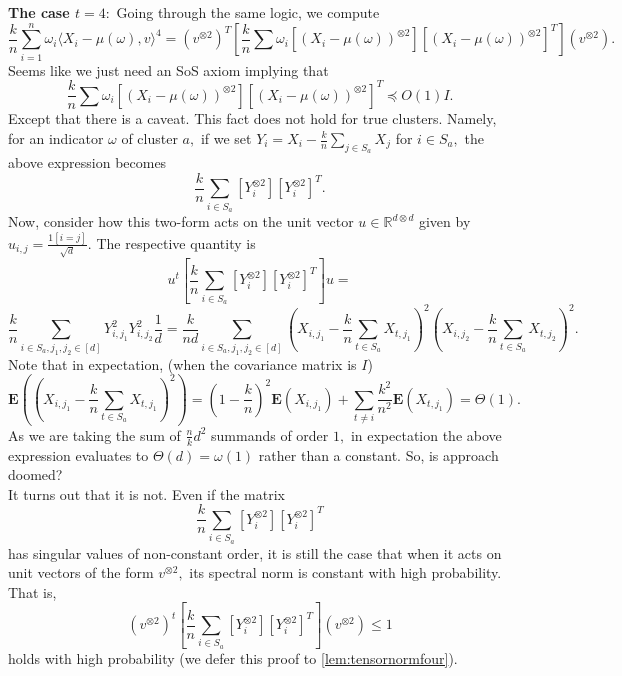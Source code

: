 \documentclass[12pt]{article}%
\newcommand{\expect}{\mathbf{E}}
\begin{document}
\noindent
\textbf{The case $t = 4:$ }Going through the same logic, we compute
$$
\frac{k}{n}
\sum^n_{i=1} \omega_i 
\langle X_i - \mu(\omega), 
v\rangle ^4  = 
(v^{\otimes 2})^T
\left[
\frac{k}{n}
\sum \omega_i
\left[(X_i - \mu(\omega))^{\otimes 2}\right]
\left[(X_i - \mu(\omega))^{\otimes 2}\right]^T
\right]
(v^{\otimes 2}).
$$
Seems like we just need an SoS axiom implying that 
$$
\frac{k}{n}
\sum \omega_i
\left[(X_i - \mu(\omega))^{\otimes 2}\right]
\left[(X_i - \mu(\omega))^{\otimes 2}\right]^T \preceq 
O(1)I.
$$
Except that there is a caveat. This fact does not hold for true clusters. Namely, for an indicator $\omega$ of cluster $a,$ if we set $Y_i = X_i - \frac{k}{n}\sum_{j \in S_a}X_j$ for $i \in S_a,$ the above expression becomes
$$
\frac{k}{n}
\sum_{i \in S_a}
\left[Y_i^{\otimes 2}\right]
\left[Y_i^{\otimes 2}\right]^T.
$$
Now, consider how this two-form acts on the unit vector $u \in \mathbb{R}^{d\otimes d}$ given by $u_{i,j} = 
\frac{1[i = j]}{\sqrt{d}}.
$ The respective quantity is
$$
u^t\left[
\frac{k}{n}
\sum_{i \in S_a}
\left[Y_i^{\otimes 2}\right]
\left[Y_i^{\otimes 2}\right]^T
\right]u = 
$$
$$
\frac{k}{n}\sum_{i \in S_a, j_1, j_2 \in [d]} Y_{i,j_1}^2Y_{i,j_2}^2\frac{1}{d} = 
\frac{k}{nd}\sum_{i \in S_a, j_1,j_2 \in [d]}
(X_{i,j_1} - \frac{k}{n}\sum_{t \in S_a}X_{t,j_1})^2
(X_{i,j_2} - \frac{k}{n}\sum_{t \in S_a}X_{t,j_2})^2
.
$$
Note that in expectation, (when the covariance matrix is $I$)
$$\expect((X_{i,j_1} - \frac{k}{n}\sum_{t \in S_a}X_{t,j_1})^2) = 
(1 - \frac{k}{n})^2 \expect (X_{i,j_1}) + 
\sum_{t\neq i}\frac{k^2}{n^2}\expect(X_{t,j_1})
 = \Theta(1).
$$
As we are taking the sum of $\frac{n}{k}d^2$ summands of order $1,$ in expectation the above expression evaluates to 
$\Theta(d) = \omega(1)$ rather than a constant. So, is approach doomed?\\

\noindent
It turns out that it is not. Even if the matrix 
$$
\frac{k}{n}
\sum_{i \in S_a}
\left[Y_i^{\otimes 2}\right]
\left[Y_i^{\otimes 2}\right]^T
$$
has singular values of non-constant order, it is still the case that when it acts on unit vectors of the form $v^{\otimes 2},$ its spectral norm is constant with high probability. That is,
\begin{equation}
    \label{eq:tensorbound}
    (v^{\otimes 2})^t\left[
\frac{k}{n}
\sum_{i \in S_a}
\left[Y_i^{\otimes 2}\right]
\left[Y_i^{\otimes 2}\right]^T
\right](v^{\otimes 2})\le 1
\end{equation}
holds with high probability (we defer this proof to \cref{lem:tensornormfour}).\\
\end{document}
